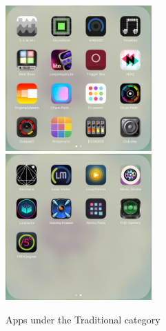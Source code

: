 \bigskip
\begin{figure}[h]
  \includegraphics[width=0.50\textwidth]{images/Traditional1.png}
  \includegraphics[width=0.50\textwidth]{images/Traditional2.png}
  \caption{Apps under the Traditional category}
  \label{fig: Traditional}
\end{figure}
\bigskip
